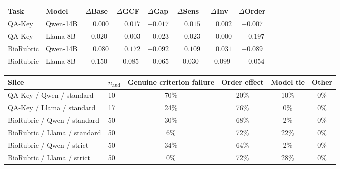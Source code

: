 \documentclass[11pt]{article}
\newcommand{\qwenS}{Qwen-14B\xspace}
\newcommand{\llamaS}{Llama-8B\xspace}
\newcommand{\qakey}{QA-Key\xspace}
\newcommand{\biorubric}{BioRubric\xspace}
\begin{document}
\begin{center}
  {\captionsetup{hypcap=false}}
  \label{tab:strict-deltas}
  \small
  \begin{tabular}{@{}llcccccc@{}}
    \toprule
    Task & Model & $\Delta$Base & $\Delta$GCF & $\Delta$Gap & $\Delta$Sens & $\Delta$Inv & $\Delta$Order \\
    \midrule
    \qakey & \qwenS & $\phantom{-}0.000$ & $\phantom{-}0.017$ & $-0.017$ & $\phantom{-}0.015$ & $\phantom{-}0.002$ & $-0.007$ \\
    \qakey & \llamaS & $-0.020$ & $\phantom{-}0.003$ & $-0.023$ & $\phantom{-}0.023$ & $\phantom{-}0.000$ & $\phantom{-}0.197$ \\
    \midrule
    \biorubric & \qwenS & $\phantom{-}0.080$ & $\phantom{-}0.172$ & $-0.092$ & $\phantom{-}0.109$ & $\phantom{-}0.031$ & $-0.089$ \\
    \biorubric & \llamaS & $-0.150$ & $-0.085$ & $-0.065$ & $-0.030$ & $-0.099$ & $\phantom{-}0.054$ \\
    \bottomrule
  \end{tabular}
\end{center}

\begin{center}
  {\captionsetup{hypcap=false}}
  \label{tab:audit-summary}
  \small
  \begin{tabular}{@{}llcccc@{}}
    \toprule
    Slice & $n_{\text{aud}}$ & Genuine criterion failure & Order effect & Model tie & Other \\
    \midrule
    QA-Key / Qwen / standard & 10 & 70\% & 20\% & 10\% & 0\% \\
    QA-Key / Llama / standard & 17 & 24\% & 76\% & 0\% & 0\% \\
    BioRubric / Qwen / standard & 50 & 30\% & 68\% & 2\% & 0\% \\
    BioRubric / Llama / standard & 50 & 6\% & 72\% & 22\% & 0\% \\
    BioRubric / Qwen / strict & 50 & 34\% & 64\% & 2\% & 0\% \\
    BioRubric / Llama / strict & 50 & 0\% & 72\% & 28\% & 0\% \\
    \bottomrule
  \end{tabular}
\end{center}
\end{document}
